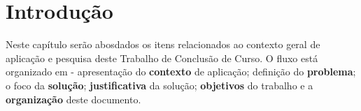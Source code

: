 \chapter{Introdução}
\label{chap:intro}

Neste capítulo serão abosdados os itens relacionados ao contexto geral de
aplicação e pesquisa deste Trabalho de Conclusão de Curso. O fluxo está
organizado em - apresentação do \textbf{contexto} de aplicação; definição do
\textbf{problema}; o foco da \textbf{solução}; \textbf{justificativa} da solução; \textbf{objetivos}
do trabalho e a \textbf{organização} deste documento.




